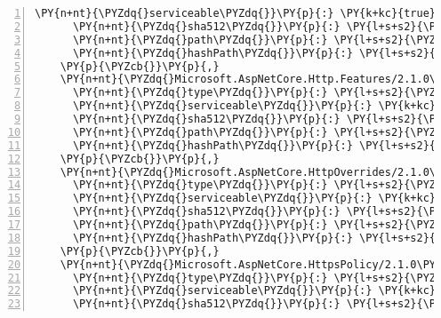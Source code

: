 \begin{Verbatim}[commandchars=\\\{\},numbers=left,firstnumber=1,stepnumber=1,numberblanklines=0]
      \PY{n+nt}{\PYZdq{}serviceable\PYZdq{}}\PY{p}{:} \PY{k+kc}{true}\PY{p}{,}
      \PY{n+nt}{\PYZdq{}sha512\PYZdq{}}\PY{p}{:} \PY{l+s+s2}{\PYZdq{}sha512\PYZhy{}kaZdlbFmZ0MCL4t+tX5X5uH3WdUbBKHi+Oeg4OQRHGAwczB6AKTNnwvOYhLhPeQTeVXZkwB0vUvR3RsrtH79Gw==\PYZdq{}}\PY{p}{,}
      \PY{n+nt}{\PYZdq{}path\PYZdq{}}\PY{p}{:} \PY{l+s+s2}{\PYZdq{}microsoft.aspnetcore.http.extensions/2.1.0\PYZhy{}rc1\PYZhy{}final\PYZdq{}}\PY{p}{,}
      \PY{n+nt}{\PYZdq{}hashPath\PYZdq{}}\PY{p}{:} \PY{l+s+s2}{\PYZdq{}microsoft.aspnetcore.http.extensions.2.1.0\PYZhy{}rc1\PYZhy{}final.nupkg.sha512\PYZdq{}}
    \PY{p}{\PYZcb{}}\PY{p}{,}
    \PY{n+nt}{\PYZdq{}Microsoft.AspNetCore.Http.Features/2.1.0\PYZhy{}rc1\PYZhy{}final\PYZdq{}}\PY{p}{:} \PY{p}{\PYZob{}}
      \PY{n+nt}{\PYZdq{}type\PYZdq{}}\PY{p}{:} \PY{l+s+s2}{\PYZdq{}package\PYZdq{}}\PY{p}{,}
      \PY{n+nt}{\PYZdq{}serviceable\PYZdq{}}\PY{p}{:} \PY{k+kc}{true}\PY{p}{,}
      \PY{n+nt}{\PYZdq{}sha512\PYZdq{}}\PY{p}{:} \PY{l+s+s2}{\PYZdq{}sha512\PYZhy{}u44WchKqlvgilTzD2O0Rm3FS4L0g6buQ+J6ShUpatui5PMjF6RRshqDqoQICBbP/elAcTgsERJ1/N6tPUWTfLg==\PYZdq{}}\PY{p}{,}
      \PY{n+nt}{\PYZdq{}path\PYZdq{}}\PY{p}{:} \PY{l+s+s2}{\PYZdq{}microsoft.aspnetcore.http.features/2.1.0\PYZhy{}rc1\PYZhy{}final\PYZdq{}}\PY{p}{,}
      \PY{n+nt}{\PYZdq{}hashPath\PYZdq{}}\PY{p}{:} \PY{l+s+s2}{\PYZdq{}microsoft.aspnetcore.http.features.2.1.0\PYZhy{}rc1\PYZhy{}final.nupkg.sha512\PYZdq{}}
    \PY{p}{\PYZcb{}}\PY{p}{,}
    \PY{n+nt}{\PYZdq{}Microsoft.AspNetCore.HttpOverrides/2.1.0\PYZhy{}rc1\PYZhy{}final\PYZdq{}}\PY{p}{:} \PY{p}{\PYZob{}}
      \PY{n+nt}{\PYZdq{}type\PYZdq{}}\PY{p}{:} \PY{l+s+s2}{\PYZdq{}package\PYZdq{}}\PY{p}{,}
      \PY{n+nt}{\PYZdq{}serviceable\PYZdq{}}\PY{p}{:} \PY{k+kc}{true}\PY{p}{,}
      \PY{n+nt}{\PYZdq{}sha512\PYZdq{}}\PY{p}{:} \PY{l+s+s2}{\PYZdq{}sha512\PYZhy{}b4E6641KZgkMNrwIOUGPZNzq/6BAR7Z5xVJFIjj7Au2dfwqokA4RvKPMaWo7quJqlBsAD5UfWmfrBXg18lU6Dw==\PYZdq{}}\PY{p}{,}
      \PY{n+nt}{\PYZdq{}path\PYZdq{}}\PY{p}{:} \PY{l+s+s2}{\PYZdq{}microsoft.aspnetcore.httpoverrides/2.1.0\PYZhy{}rc1\PYZhy{}final\PYZdq{}}\PY{p}{,}
      \PY{n+nt}{\PYZdq{}hashPath\PYZdq{}}\PY{p}{:} \PY{l+s+s2}{\PYZdq{}microsoft.aspnetcore.httpoverrides.2.1.0\PYZhy{}rc1\PYZhy{}final.nupkg.sha512\PYZdq{}}
    \PY{p}{\PYZcb{}}\PY{p}{,}
    \PY{n+nt}{\PYZdq{}Microsoft.AspNetCore.HttpsPolicy/2.1.0\PYZhy{}rc1\PYZhy{}final\PYZdq{}}\PY{p}{:} \PY{p}{\PYZob{}}
      \PY{n+nt}{\PYZdq{}type\PYZdq{}}\PY{p}{:} \PY{l+s+s2}{\PYZdq{}package\PYZdq{}}\PY{p}{,}
      \PY{n+nt}{\PYZdq{}serviceable\PYZdq{}}\PY{p}{:} \PY{k+kc}{true}\PY{p}{,}
      \PY{n+nt}{\PYZdq{}sha512\PYZdq{}}\PY{p}{:} \PY{l+s+s2}{\PYZdq{}sha512\PYZhy{}d5sF+dj12DNbL7yl8Q7nRRWfBQ8D256+CgIGuTn0S9Tmcy/vReUZ1CNkO/7jnjR1aKwPEZn9OVfwPyLQIFdRhg==\PYZdq{}}\PY{p}{,}

\end{Verbatim}
